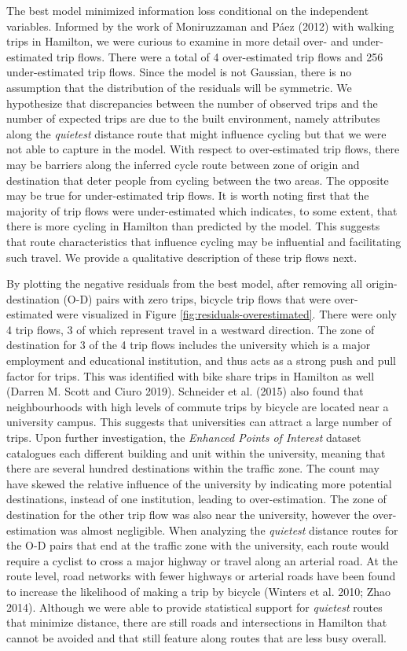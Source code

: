 \documentclass[smallextended]{svjour3}       %
\begin{document}
The best model minimized information loss conditional on the independent
variables. Informed by the work of Moniruzzaman and Páez (2012) with
walking trips in Hamilton, we were curious to examine in more detail
over- and under-estimated trip flows. There were a total of 4
over-estimated trip flows and 256 under-estimated trip flows. Since the
model is not Gaussian, there is no assumption that the distribution of
the residuals will be symmetric. We hypothesize that discrepancies
between the number of observed trips and the number of expected trips
are due to the built environment, namely attributes along the
\emph{quietest} distance route that might influence cycling but that we
were not able to capture in the model. With respect to over-estimated
trip flows, there may be barriers along the inferred cycle route between
zone of origin and destination that deter people from cycling between
the two areas. The opposite may be true for under-estimated trip flows.
It is worth noting first that the majority of trip flows were
under-estimated which indicates, to some extent, that there is more
cycling in Hamilton than predicted by the model. This suggests that
route characteristics that influence cycling may be influential and
facilitating such travel. We provide a qualitative description of these
trip flows next.

By plotting the negative residuals from the best model, after removing
all origin-destination (O-D) pairs with zero trips, bicycle trip flows
that were over-estimated were visualized in Figure
\ref{fig:residuals-overestimated}. There were only 4 trip flows, 3 of
which represent travel in a westward direction. The zone of destination
for 3 of the 4 trip flows includes the university which is a major
employment and educational institution, and thus acts as a strong push
and pull factor for trips. This was identified with bike share trips in
Hamilton as well (Darren M. Scott and Ciuro 2019). Schneider et al.
(2015) also found that neighbourhoods with high levels of commute trips
by bicycle are located near a university campus. This suggests that
universities can attract a large number of trips. Upon further
investigation, the \emph{Enhanced Points of Interest} dataset catalogues
each different building and unit within the university, meaning that
there are several hundred destinations within the traffic zone. The
count may have skewed the relative influence of the university by
indicating more potential destinations, instead of one institution,
leading to over-estimation. The zone of destination for the other trip
flow was also near the university, however the over-estimation was
almost negligible. When analyzing the \emph{quietest} distance routes
for the O-D pairs that end at the traffic zone with the university, each
route would require a cyclist to cross a major highway or travel along
an arterial road. At the route level, road networks with fewer highways
or arterial roads have been found to increase the likelihood of making a
trip by bicycle (Winters et al. 2010; Zhao 2014). Although we were able
to provide statistical support for \emph{quietest} routes that minimize
distance, there are still roads and intersections in Hamilton that
cannot be avoided and that still feature along routes that are less busy
overall.
\end{document}
